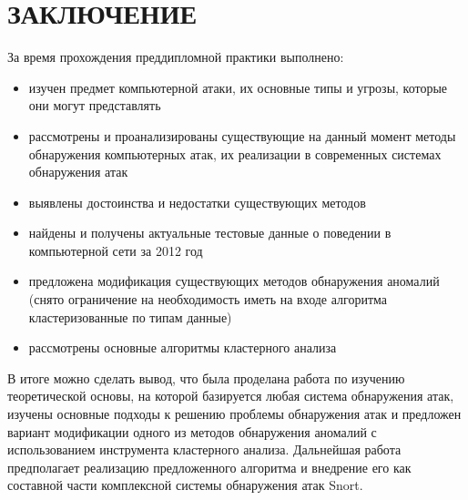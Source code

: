 \section*{ЗАКЛЮЧЕНИЕ}

За время прохождения преддипломной практики выполнено:

\begin{itemize}

\item изучен предмет компьютерной атаки, их основные типы и угрозы, которые они могут представлять

\item рассмотрены и проанализированы существующие на данный момент методы обнаружения компьютерных
атак, их реализации в современных системах обнаружения атак

\item выявлены достоинства и недостатки существующих методов

\item найдены и получены актуальные тестовые данные о поведении в компьютерной сети 
за 2012 год \cite{bib:iscx2012}

\item предложена модификация существующих методов обнаружения аномалий (снято ограничение
на необходимость иметь на входе алгоритма кластеризованные по типам данные)

\item рассмотрены основные алгоритмы кластерного анализа

\end{itemize}

В итоге можно сделать вывод, что была проделана работа по изучению теоретической основы, на
которой базируется любая система обнаружения атак, изучены основные подходы к решению проблемы
обнаружения атак и предложен вариант модификации одного из методов обнаружения аномалий 
с использованием инструмента кластерного анализа.
Дальнейшая работа предполагает реализацию предложенного алгоритма и внедрение его как 
составной части комплексной системы обнаружения атак Snort.

\newpage

\renewcommand{\refname}{СПИСОК ИСПОЛЬЗОВАННЫХ ИСТОЧНИКОВ}

